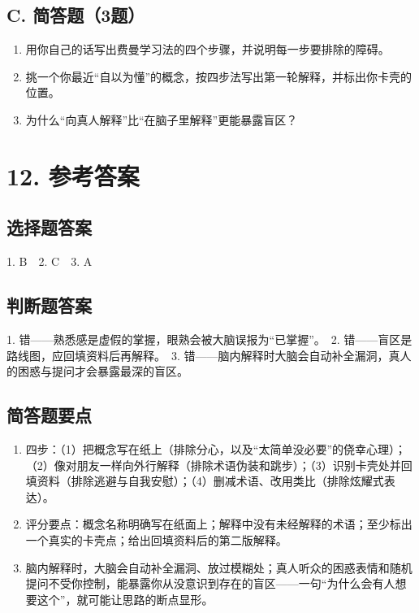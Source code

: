 \documentclass[UTF8,a4paper,11pt]{ctexart}
\begin{document}
\subsection*{C. 简答题（3题）}
\begin{enumerate}
  \item 用你自己的话写出费曼学习法的四个步骤，并说明每一步要排除的障碍。
  \item 挑一个你最近“自以为懂”的概念，按四步法写出第一轮解释，并标出你卡壳的位置。
  \item 为什么“向真人解释”比“在脑子里解释”更能暴露盲区？
\end{enumerate}

\section*{12. 参考答案}
\subsection*{选择题答案}
1. B　2. C　3. A

\subsection*{判断题答案}
1. 错——熟悉感是虚假的掌握，眼熟会被大脑误报为“已掌握”。　2. 错——盲区是路线图，应回填资料后再解释。　3. 错——脑内解释时大脑会自动补全漏洞，真人的困惑与提问才会暴露最深的盲区。

\subsection*{简答题要点}
\begin{enumerate}
  \item 四步：（1）把概念写在纸上（排除分心，以及“太简单没必要”的侥幸心理）；（2）像对朋友一样向外行解释（排除术语伪装和跳步）；（3）识别卡壳处并回填资料（排除逃避与自我安慰）；（4）删减术语、改用类比（排除炫耀式表达）。
  \item 评分要点：概念名称明确写在纸面上；解释中没有未经解释的术语；至少标出一个真实的卡壳点；给出回填资料后的第二版解释。
  \item 脑内解释时，大脑会自动补全漏洞、放过模糊处；真人听众的困惑表情和随机提问不受你控制，能暴露你从没意识到存在的盲区——一句“为什么会有人想要这个”，就可能让思路的断点显形。
\end{enumerate}
\end{document}
